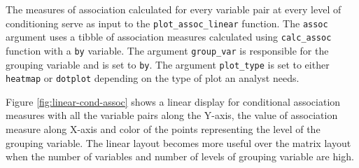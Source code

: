 The measures of association calculated for every variable pair at every
level of conditioning serve as input to the \texttt{plot\_assoc\_linear}
function. The \texttt{assoc} argument uses a tibble of association
measures calculated using \texttt{calc\_assoc} function with a
\texttt{by} variable. The argument \texttt{group\_var} is responsible
for the grouping variable and is set to \texttt{by}. The argument
\texttt{plot\_type} is set to either \texttt{heatmap} or
\texttt{dotplot} depending on the type of plot an analyst needs.

Figure \ref{fig:linear-cond-assoc} shows a linear display for
conditional association measures with all the variable pairs along the
Y-axis, the value of association measure along X-axis and color of the
points representing the level of the grouping variable. The linear
layout becomes more useful over the matrix layout when the number of
variables and number of levels of grouping variable are high.


